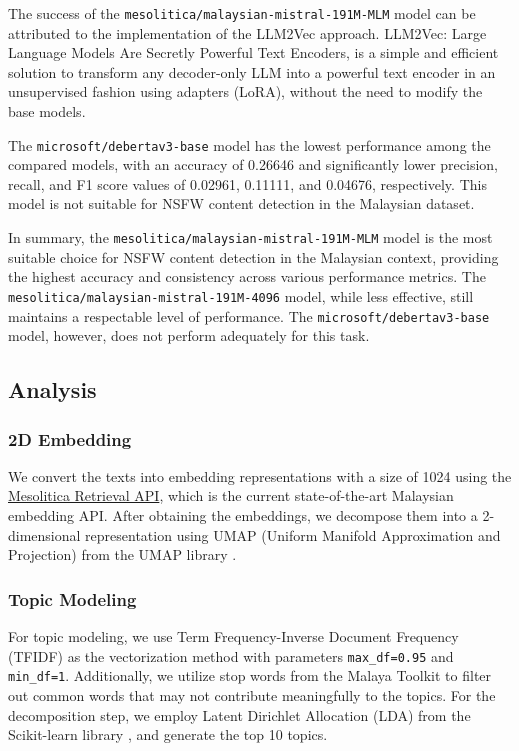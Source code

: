\documentclass[preprint]{article}
\begin{document}
The success of the \texttt{mesolitica/malaysian-mistral-191M-MLM} model can be attributed to the implementation of the LLM2Vec \cite{behnamghader2024llm2veclargelanguagemodels} approach. LLM2Vec: Large Language Models Are Secretly Powerful Text Encoders, is a simple and efficient solution to transform any decoder-only LLM into a powerful text encoder in an unsupervised fashion using adapters (LoRA), without the need to modify the base models.

The \texttt{microsoft/debertav3-base} model has the lowest performance among the compared models, with an accuracy of 0.26646 and significantly lower precision, recall, and F1 score values of 0.02961, 0.11111, and 0.04676, respectively. This model is not suitable for NSFW content detection in the Malaysian dataset.

In summary, the \texttt{mesolitica/malaysian-mistral-191M-MLM} model is the most suitable choice for NSFW content detection in the Malaysian context, providing the highest accuracy and consistency across various performance metrics. The \texttt{mesolitica/malaysian-mistral-191M-4096} model, while less effective, still maintains a respectable level of performance. The \texttt{microsoft/debertav3-base} model, however, does not perform adequately for this task.

\subsection{Analysis}

\subsubsection*{2D Embedding}

We convert the texts into embedding representations with a size of 1024 using the \href{https://mesolitica.com/retrieval}{Mesolitica Retrieval API}, which is the current state-of-the-art Malaysian embedding API. After obtaining the embeddings, we decompose them into a 2-dimensional representation using UMAP (Uniform Manifold Approximation and Projection) \cite{2018arXivUMAP} from the UMAP library \cite{mcinnes2018umap-software}.

\subsubsection*{Topic Modeling}

For topic modeling, we use Term Frequency-Inverse Document Frequency (TFIDF) as the vectorization method with parameters \texttt{max\_df=0.95} and \texttt{min\_df=1}. Additionally, we utilize stop words from the Malaya Toolkit \cite{Malaya} to filter out common words that may not contribute meaningfully to the topics. For the decomposition step, we employ Latent Dirichlet Allocation (LDA) from the Scikit-learn library \cite{scikit-learn}, and generate the top 10 topics.
\end{document}
